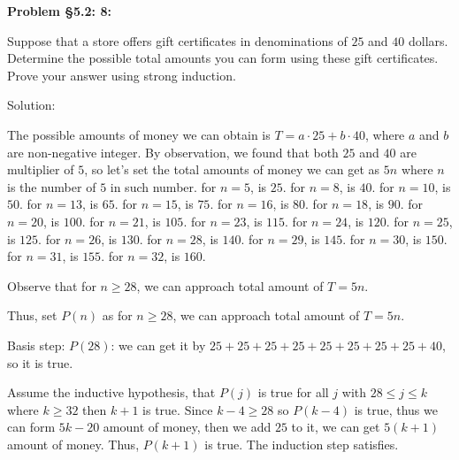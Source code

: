 \documentclass{article}
\newenvironment{problem}[1]
{\begin{mdframed}[default]
\textbf{Problem #1:}
}
{\end{mdframed}
}
\begin{document}
\begin{problem}{\S 5.2: 8}
Suppose that a store offers gift certificates in denominations of $25$ and $40$
dollars. Determine the possible total amounts you can form using these gift
certificates. Prove your answer using strong induction.\newline


Solution:

The possible amounts of money we can obtain is $T=a\cdot25+b\cdot40$, where $a$ and $b$ are non-negative integer.
By observation, we found that both $25$ and $40$ are multiplier of $5$, so let's set the total amounts of money we can get as $5n$ where $n$ is the number of $5$ in such number.
for $n=5$, is $25$. for $n=8$, is $40$. for $n=10$, is $50$. for $n=13$, is $65$. for $n=15$, is $75$. for $n=16$, is $80$. for $n=18$, is $90$. for $n=20$, is $100$.
for $n=21$, is $105$. for $n=23$, is $115$. for $n=24$, is $120$. for $n=25$, is $125$. for $n=26$, is $130$. for $n=28$, is $140$. for $n=29$, is $145$. for $n=30$, is $150$. for $n=31$, is $155$. for $n=32$, is $160$.

Observe that for $n\geq28$, we can approach total amount of $T=5n$.

Thus, set $P(n)$ as for $n\geq28$, we can approach total amount of $T=5n$.

Basis step: $P(28)$: we can get it by $25+25+25+25+25+25+25+25+40$, so it is true.

Assume the inductive hypothesis, that $P(j)$ is true for all $j$ with $28\leq j\leq k$ where $k\geq 32$ then $k+1$ is true.
Since $k-4\geq 28$ so $P(k-4)$ is true, thus we can form $5k-20$ amount of money, then we add $25$ to it, we can get $5(k+1)$ amount of money. Thus, $P(k+1)$ is true.
The induction step satisfies. 

\end{problem}
\end{document}
